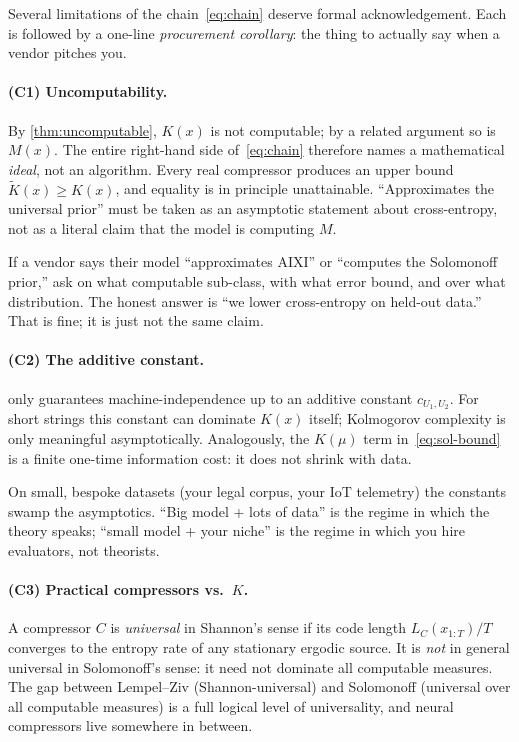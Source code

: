 \documentclass[12pt,a4paper]{article}
\theoremstyle{plain}
\theoremstyle{definition}
\begin{document}
Several limitations of the chain~\eqref{eq:chain} deserve formal
acknowledgement. Each is followed by a one-line \emph{procurement
corollary}: the thing to actually say when a vendor pitches you.

\paragraph{(C1) Uncomputability.}
By \cref{thm:uncomputable}, $K(x)$ is not computable; by a related
argument so is $M(x)$. The entire right-hand side of~\eqref{eq:chain}
therefore names a mathematical \emph{ideal}, not an algorithm. Every
real compressor produces an upper bound $\tilde K(x) \ge K(x)$, and
equality is in principle unattainable. ``Approximates the universal
prior'' must be taken as an asymptotic statement about cross-entropy,
not as a literal claim that the model is computing $M$.

\begin{procurement}
If a vendor says their model ``approximates AIXI'' or ``computes the
Solomonoff prior,'' ask on what computable sub-class, with what
error bound, and over what distribution. The honest answer is
``we lower cross-entropy on held-out data.'' That is fine; it is
just not the same claim.
\end{procurement}

\paragraph{(C2) The additive constant.}
 only guarantees machine-independence up to an
additive constant $c_{U_1, U_2}$. For short strings this constant
can dominate $K(x)$ itself; Kolmogorov complexity is only meaningful
asymptotically. Analogously, the $K(\mu)$ term
in~\eqref{eq:sol-bound} is a finite one-time information cost: it
does not shrink with data.

\begin{procurement}
On small, bespoke datasets (your legal corpus, your IoT telemetry)
the constants swamp the asymptotics. ``Big model + lots of data''
is the regime in which the theory speaks; ``small model + your
niche'' is the regime in which you hire evaluators, not theorists.
\end{procurement}

\paragraph{(C3) Practical compressors vs.\ $K$.}
A compressor $C$ is \emph{universal} in Shannon's sense if its code
length $L_C(x_{1:T})/T$ converges to the entropy rate of any
stationary ergodic source. It is \emph{not} in general universal in
Solomonoff's sense: it need not dominate all computable measures.
The gap between Lempel--Ziv (Shannon-universal) and Solomonoff
(universal over all computable measures) is a full logical level of
universality, and neural compressors live somewhere in between.
\end{document}
